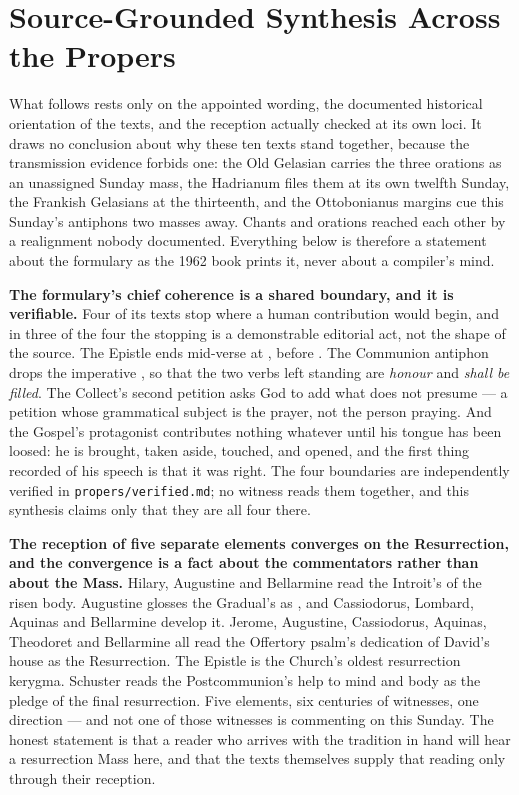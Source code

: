 \sectionguard
\section*{Source-Grounded Synthesis Across the Propers}

What follows rests only on the appointed wording, the documented historical
orientation of the texts, and the reception actually checked at its own loci.
It draws no conclusion about why these ten texts stand together, because the
transmission evidence forbids one: the Old Gelasian carries the three orations
as an unassigned Sunday mass, the Hadrianum files them at its own twelfth
Sunday, the Frankish Gelasians at the thirteenth, and the Ottobonianus margins
cue this Sunday's antiphons two masses away. Chants and orations reached each
other by a realignment nobody documented. Everything below is therefore a
statement about the formulary as the 1962 book prints it, never about a
compiler's mind.

\textbf{The formulary's chief coherence is a shared boundary, and it is
verifiable.} Four of its texts stop where a human contribution would begin, and
in three of the four the stopping is a demonstrable editorial act, not the
shape of the source. The Epistle ends mid-verse at ,
before . The Communion antiphon
drops the imperative , so that the two verbs left standing are
\textit{honour} and \textit{shall be filled}. The Collect's second petition
asks God to add what  does not presume --- a petition whose
grammatical subject is the prayer, not the person praying. And the Gospel's
protagonist contributes nothing whatever until his tongue has been loosed: he
is brought, taken aside, touched, and opened, and the first thing recorded of
his speech is that it was right. The four boundaries are independently
verified in \texttt{propers/verified.md}; no witness reads them together, and
this synthesis claims only that they are all four there.

\textbf{The reception of five separate elements converges on the
Resurrection, and the convergence is a fact about the commentators rather than
about the Mass.} Hilary, Augustine and Bellarmine read the Introit's
 of the risen body. Augustine glosses the
Gradual's  as , and
Cassiodorus, Lombard, Aquinas and Bellarmine develop it. Jerome, Augustine,
Cassiodorus, Aquinas, Theodoret and Bellarmine all read the Offertory psalm's
dedication of David's house as the Resurrection. The Epistle is the Church's
oldest resurrection kerygma. Schuster reads the Postcommunion's help to mind
and body as the pledge of the final resurrection. Five elements, six centuries
of witnesses, one direction --- and not one of those witnesses is commenting on
this Sunday. The honest statement is that a reader who arrives with the
tradition in hand will hear a resurrection Mass here, and that the texts
themselves supply that reading only through their reception.

